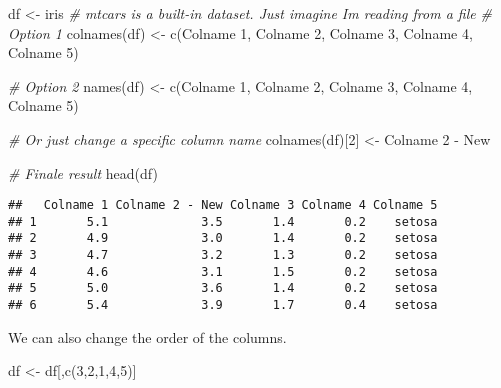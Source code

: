 \documentclass[
]{book}
\newenvironment{Shaded}{\begin{snugshade}}{\end{snugshade}}
\newcommand{\CommentTok}[1]{\textcolor[rgb]{0.56,0.35,0.01}{\textit{#1}}}
\newcommand{\DecValTok}[1]{\textcolor[rgb]{0.00,0.00,0.81}{#1}}
\newcommand{\FunctionTok}[1]{\textcolor[rgb]{0.00,0.00,0.00}{#1}}
\newcommand{\NormalTok}[1]{#1}
\newcommand{\OtherTok}[1]{\textcolor[rgb]{0.56,0.35,0.01}{#1}}
\newcommand{\StringTok}[1]{\textcolor[rgb]{0.31,0.60,0.02}{#1}}
\begin{document}
\begin{Shaded}
\begin{Highlighting}[]
\NormalTok{df }\OtherTok{\textless{}{-}}\NormalTok{ iris  }\CommentTok{\# mtcars is a built{-}in dataset. Just imagine I\textquotesingle{}m reading from a file}
\CommentTok{\# Option 1}
\FunctionTok{colnames}\NormalTok{(df) }\OtherTok{\textless{}{-}} \FunctionTok{c}\NormalTok{(}\StringTok{\textquotesingle{}Colname 1\textquotesingle{}}\NormalTok{, }\StringTok{\textquotesingle{}Colname 2\textquotesingle{}}\NormalTok{, }\StringTok{\textquotesingle{}Colname 3\textquotesingle{}}\NormalTok{, }\StringTok{\textquotesingle{}Colname 4\textquotesingle{}}\NormalTok{, }\StringTok{\textquotesingle{}Colname 5\textquotesingle{}}\NormalTok{)}

\CommentTok{\# Option 2}
\FunctionTok{names}\NormalTok{(df) }\OtherTok{\textless{}{-}} \FunctionTok{c}\NormalTok{(}\StringTok{\textquotesingle{}Colname 1\textquotesingle{}}\NormalTok{, }\StringTok{\textquotesingle{}Colname 2\textquotesingle{}}\NormalTok{, }\StringTok{\textquotesingle{}Colname 3\textquotesingle{}}\NormalTok{, }\StringTok{\textquotesingle{}Colname 4\textquotesingle{}}\NormalTok{, }\StringTok{\textquotesingle{}Colname 5\textquotesingle{}}\NormalTok{)}

\CommentTok{\# Or just change a specific column name}
\FunctionTok{colnames}\NormalTok{(df)[}\DecValTok{2}\NormalTok{] }\OtherTok{\textless{}{-}} \StringTok{\textquotesingle{}Colname 2 {-} New\textquotesingle{}}

\CommentTok{\# Finale result}
\FunctionTok{head}\NormalTok{(df)}
\end{Highlighting}
\end{Shaded}

\begin{verbatim}
##   Colname 1 Colname 2 - New Colname 3 Colname 4 Colname 5
## 1       5.1             3.5       1.4       0.2    setosa
## 2       4.9             3.0       1.4       0.2    setosa
## 3       4.7             3.2       1.3       0.2    setosa
## 4       4.6             3.1       1.5       0.2    setosa
## 5       5.0             3.6       1.4       0.2    setosa
## 6       5.4             3.9       1.7       0.4    setosa
\end{verbatim}

We can also change the order of the columns.

\begin{Shaded}
\begin{Highlighting}[]
\NormalTok{df }\OtherTok{\textless{}{-}}\NormalTok{ df[,}\FunctionTok{c}\NormalTok{(}\DecValTok{3}\NormalTok{,}\DecValTok{2}\NormalTok{,}\DecValTok{1}\NormalTok{,}\DecValTok{4}\NormalTok{,}\DecValTok{5}\NormalTok{)]}
\end{Highlighting}
\end{Shaded}
\end{document}
